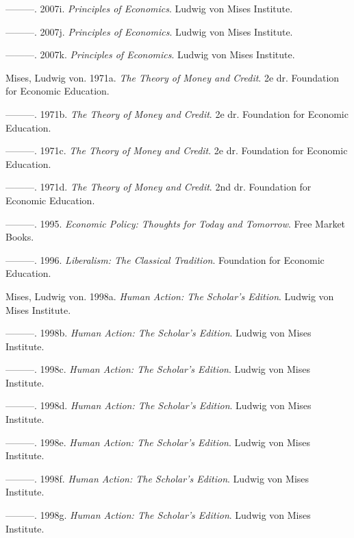 \documentclass[
  a5paper,
  smalldemyvopaper,11pt,twoside,onecolumn,openright,extrafontsizes,
hidelinks]{memoir}
\newlength{\cslhangindent}
\newenvironment{CSLReferences}[2] %
 {\begin{list}{}{%
  \setlength{\itemindent}{0pt}
  \setlength{\leftmargin}{0pt}
  \setlength{\parsep}{0pt}
  \ifodd #1
   \setlength{\leftmargin}{\cslhangindent}
   \setlength{\itemindent}{-1\cslhangindent}
  \fi
  \setlength{\itemsep}{#2\baselineskip}}}
 {\end{list}}
\begin{document}
\begin{CSLReferences}{1}{0}
---------. 2007i. \emph{Principles of Economics}. Ludwig von Mises
Institute.

---------. 2007j. \emph{Principles of Economics}. Ludwig von Mises
Institute.

---------. 2007k. \emph{Principles of Economics}. Ludwig von Mises
Institute.

Mises, Ludwig von. 1971a. \emph{The Theory of Money and Credit}. 2e dr.
Foundation for Economic Education.

---------. 1971b. \emph{The Theory of Money and Credit}. 2e dr.
Foundation for Economic Education.

---------. 1971c. \emph{The Theory of Money and Credit}. 2e dr.
Foundation for Economic Education.

---------. 1971d. \emph{The Theory of Money and Credit}. 2nd dr.
Foundation for Economic Education.

---------. 1995. \emph{Economic Policy: Thoughts for Today and
Tomorrow}. Free Market Books.

---------. 1996. \emph{Liberalism: The Classical Tradition}. Foundation
for Economic Education.

Mises, Ludwig von. 1998a. \emph{Human Action: The Scholar's Edition}.
Ludwig von Mises Institute.

---------. 1998b. \emph{Human Action: The Scholar's Edition}. Ludwig von
Mises Institute.

---------. 1998c. \emph{Human Action: The Scholar's Edition}. Ludwig von
Mises Institute.

---------. 1998d. \emph{Human Action: The Scholar's Edition}. Ludwig von
Mises Institute.

---------. 1998e. \emph{Human Action: The Scholar's Edition}. Ludwig von
Mises Institute.

---------. 1998f. \emph{Human Action: The Scholar's Edition}. Ludwig von
Mises Institute.

---------. 1998g. \emph{Human Action: The Scholar's Edition}. Ludwig von
Mises Institute.


\end{CSLReferences}
\end{document}
